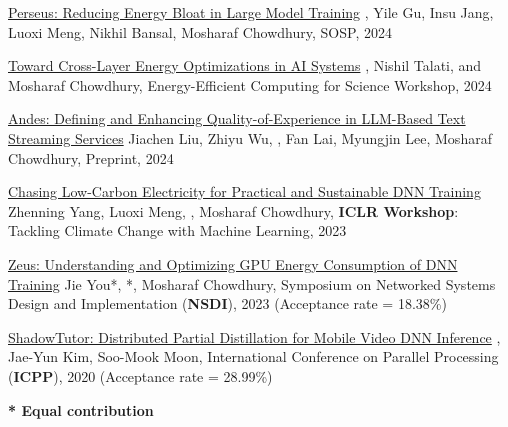 

\begin{cvlist}

  \cvlistitem
    {\href{https://arxiv.org/abs/2312.06902}{Perseus: Reducing Energy Bloat in Large Model Training}} %
    {, Yile Gu, Insu Jang, Luoxi Meng, Nikhil Bansal, Mosharaf Chowdhury, SOSP, 2024} %

  \cvlistitem
    {\href{https://arxiv.org/abs/2404.06675}{Toward Cross-Layer Energy Optimizations in AI Systems}} %
    {, Nishil Talati, and Mosharaf Chowdhury, Energy-Efficient Computing for Science Workshop, 2024} %

  \cvlistitem
    {\href{https://arxiv.org/abs/2404.16283}{Andes: Defining and Enhancing Quality-of-Experience in LLM-Based Text Streaming Services}} %
    {Jiachen Liu, Zhiyu Wu, , Fan Lai, Myungjin Lee, Mosharaf Chowdhury, Preprint, 2024} %

  \cvlistitem
    {\href{https://www.climatechange.ai/papers/iclr2023/29}{Chasing Low-Carbon Electricity for Practical and Sustainable DNN Training}} %
    {Zhenning Yang, Luoxi Meng, , Mosharaf Chowdhury, \textbf{ICLR Workshop}: Tackling Climate Change with Machine Learning, 2023} %

  \cvlistitem
    {\href{https://www.usenix.org/conference/nsdi23/presentation/you}{Zeus: Understanding and Optimizing GPU Energy Consumption of DNN Training}} %
    {Jie You*, *, Mosharaf Chowdhury, Symposium on Networked Systems Design and Implementation (\textbf{NSDI}), 2023 (Acceptance rate = 18.38\%)} %

  \cvlistitem
    {\href{https://dl.acm.org/doi/10.1145/3404397.3404404}{ShadowTutor: Distributed Partial Distillation for Mobile Video DNN Inference}} %
    {, Jae-Yun Kim, Soo-Mook Moon, International Conference on Parallel Processing (\textbf{ICPP}), 2020 (Acceptance rate = 28.99\%)} %

\end{cvlist}

\vspace{-5mm}
\begin{cvparagraph}
  \textbf{* Equal contribution}
\end{cvparagraph}
